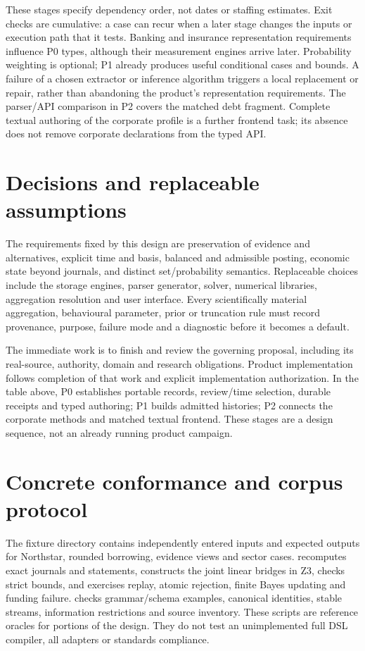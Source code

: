 These stages specify dependency order, not dates or staffing estimates.
Exit checks are cumulative: a case can recur when a later stage changes the
inputs or execution path that it tests.
Banking and insurance representation requirements influence P0 types, although
their measurement engines arrive later. Probability weighting is optional;
P1 already produces useful conditional cases and bounds. A failure of a chosen
extractor or inference algorithm triggers a local replacement or repair,
rather than abandoning the product's representation requirements.
The parser/API comparison in P2 covers the matched debt fragment. Complete
textual authoring of the corporate profile is a further frontend task;
its absence does not remove corporate declarations from the typed API.

\section{Decisions and replaceable assumptions}

The requirements fixed by this design are preservation of evidence and
alternatives, explicit time and basis, balanced and admissible posting, economic
state beyond journals, and distinct set/probability semantics. Replaceable
choices include the storage engines, parser generator, solver, numerical
libraries, aggregation resolution and user interface. Every scientifically
material aggregation, behavioural parameter, prior or truncation rule must
record provenance, purpose, failure mode and a diagnostic before it becomes a
default.

The immediate work is to finish and review the governing proposal, including
its real-source, authority, domain and research obligations. Product
implementation follows completion of that work and explicit implementation
authorization. In the table above, P0 establishes portable records, review/time
selection, durable receipts and typed authoring; P1 builds admitted histories;
P2 connects the corporate methods and matched textual frontend. These stages
are a design sequence, not an already running product campaign.

\section{Concrete conformance and corpus protocol}

The fixture directory contains independently entered inputs and expected
outputs for Northstar, rounded borrowing, evidence views and sector cases.
 recomputes exact journals and statements,
constructs the joint linear bridges in Z3, checks strict bounds, and exercises
replay, atomic rejection, finite Bayes updating and funding failure.
 checks grammar/schema examples, canonical
identities, stable streams, information restrictions and source inventory.
These scripts are reference oracles for portions of the design. They do not
test an unimplemented full DSL compiler, all adapters or standards compliance.

